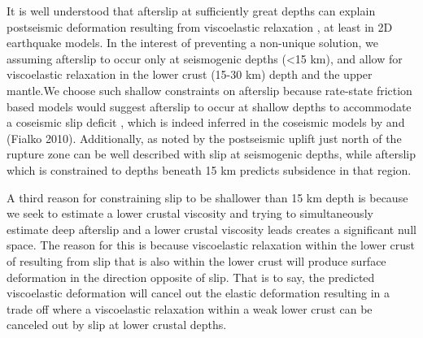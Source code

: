 \documentclass[12pt]{article}
\begin{document}
It is well understood that afterslip at sufficiently great depths can explain postseismic deformation resulting from viscoelastic relaxation \cite{Savage1990}, at least in 2D earthquake models. In the interest of preventing a non-unique solution, we assuming afterslip to occur only at seismogenic depths (<15 km), and allow for viscoelastic relaxation in the lower crust (15-30 km) depth and the upper mantle.We choose such shallow constraints on afterslip because rate-state friction based models would suggest afterslip to occur at shallow depths to accommodate a coseismic slip deficit \cite{Marone1991}, which is indeed inferred in the coseismic models by \cite{Wei2011a} and (Fialko 2010). Additionally, as noted by \cite{Rollins2015} the postseismic uplift just north of the rupture zone can be well described with slip at seismogenic depths, while afterslip which is constrained to depths beneath 15 km predicts subsidence in that region.  

A third reason for constraining slip to be shallower than 15 km depth is because we seek to estimate a lower crustal viscosity and trying to simultaneously estimate deep afterslip and a lower crustal viscosity leads creates a significant null space.  The reason for this is because viscoelastic relaxation within the lower crust of resulting from slip that is also within the lower crust will produce surface deformation in the direction opposite of slip. That is to say, the predicted viscoelastic deformation will cancel out the elastic deformation resulting in a trade off where a viscoelastic relaxation within a weak lower crust can be canceled out by slip at lower crustal depths.      
\end{document}
